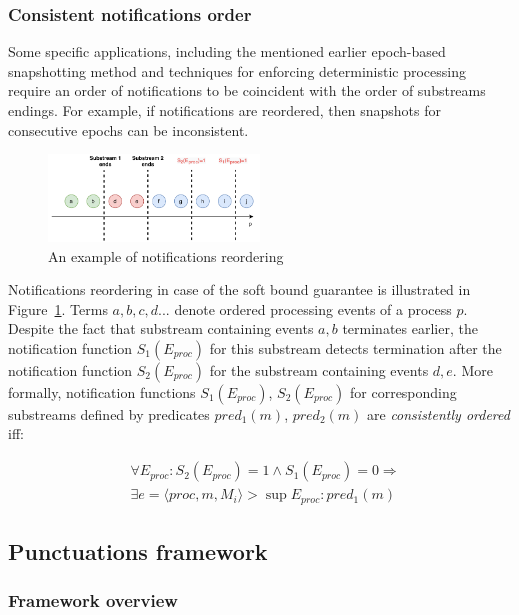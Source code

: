 \subsubsection{Consistent notifications order}
Some specific applications, including the mentioned earlier epoch-based snapshotting method and techniques for enforcing deterministic processing~\cite{we2018adbis} require an order of notifications to be coincident with the order of substreams endings. For example, if notifications are reordered, then snapshots for consecutive epochs can be inconsistent.

\begin{figure}[htbp]
  \centering
  \includegraphics[width=0.50\textwidth]{pics/notifications-reordering.pdf}
  \caption{An example of notifications reordering}
  \label{notifications_reordering}
\end{figure}

Notifications reordering in case of the soft bound guarantee is illustrated in Figure~\ref{notifications_reordering}. Terms $a,b,c,d...$ denote ordered processing events of a process $p$. Despite the fact that substream containing events $a,b$ terminates earlier, the notification function $S_1(E_{proc})$ for this substream detects termination after the notification function $S_2(E_{proc})$ for the substream containing events $d,e$. More formally, notification functions $S_1(E_{proc})$, $S_2(E_{proc})$ for corresponding substreams defined by predicates $pred_1(m)$, $pred_2(m)$ are {\em consistently ordered} iff:

\begin{align*}
& \forall E_{proc}: S_2(E_{proc})=1 \wedge S_1(E_{proc})=0 \Longrightarrow  \\
& \exists e=\langle proc, m, M_i\rangle > \sup E_{proc} : pred_1(m)
\end{align*}

\subsection{Punctuations framework}

\subsubsection{Framework overview}


